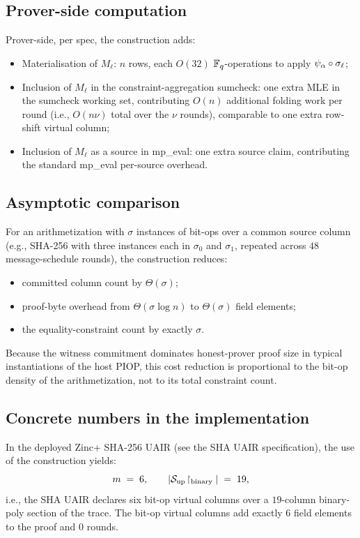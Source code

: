 \subsection{Prover-side computation}

Prover-side, per spec, the construction adds:
\begin{itemize}[leftmargin=2em]
  \item Materialisation of $M_\ell$: $n$ rows, each $O(32)$
    $\mathbb{F}_q$-operations to apply $\psi_{\alpha} \circ \sigma_\ell$;
  \item Inclusion of $M_\ell$ in the constraint-aggregation sumcheck:
    one extra MLE in the sumcheck working set, contributing $O(n)$
    additional folding work per round (i.e., $O(n \nu)$ total over
    the $\nu$ rounds), comparable to one extra row-shift virtual
    column;
  \item Inclusion of $M_\ell$ as a source in mp\_eval: one extra
    source claim, contributing the standard mp\_eval per-source
    overhead.
\end{itemize}

\subsection{Asymptotic comparison}

For an arithmetization with $\sigma$ instances of bit-ops over a
common source column (e.g., SHA-256 with three instances each in
$\sigma_0$ and $\sigma_1$, repeated across $48$ message-schedule
rounds), the construction reduces:
\begin{itemize}[leftmargin=2em]
  \item committed column count by $\Theta(\sigma)$;
  \item proof-byte overhead from $\Theta(\sigma \log n)$ to
    $\Theta(\sigma)$ field elements;
  \item the equality-constraint count by exactly $\sigma$.
\end{itemize}
Because the witness commitment dominates honest-prover proof size in
typical instantiations of the host PIOP, this cost reduction is
proportional to the bit-op density of the arithmetization, not to its
total constraint count.

\subsection{Concrete numbers in the implementation}

In the deployed Zinc+ SHA-256 UAIR (see the SHA UAIR
specification), the use of the construction yields:
\[
  m \;=\; 6, \qquad
  |\mathcal{S}_{\mathrm{up}}\!\restriction_{\mathrm{binary}}|\;=\;19,
\]
i.e., the SHA UAIR declares six bit-op virtual columns over a
$19$-column binary-poly section of the trace. The bit-op virtual
columns add exactly $6$ field elements to the proof and $0$ rounds.

